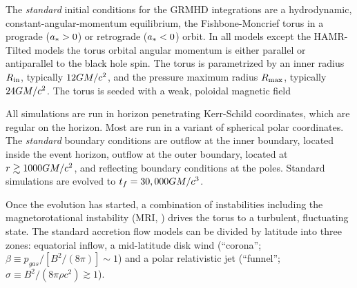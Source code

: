 The \emph{standard} initial conditions for the GRMHD integrations are a hydrodynamic, constant-angular-momentum equilibrium, the Fishbone-Moncrief torus \citep{1976ApJ...207..962F} in a prograde ($a_* > 0$) or retrograde ($a_* < 0$) orbit.  In all models except the HAMR-Tilted models the torus orbital angular momentum is either parallel or antiparallel to the black hole spin. The torus is parametrized by an inner radius $R_{\rm in}$, typically $12GM/c^2$, and the pressure maximum radius $R_{\rm max}$, typically $24GM/c^2$.
The torus is seeded with a weak, poloidal magnetic field %

All simulations are run in horizon penetrating Kerr-Schild coordinates, which are regular on the horizon.  Most are run in a variant of spherical polar coordinates.  The {\em standard} boundary conditions are outflow at the inner boundary, located inside the event horizon, outflow at the outer boundary, located at $r \gtrsim 1000 GM/c^2$, and reflecting boundary conditions at the poles.  Standard  simulations are evolved to $t_f=30,000 GM/c^3$.

Once the evolution has started, a combination of instabilities including the magnetorotational instability (MRI, \citealt{1992ApJ...400..610B}) drives the torus to a turbulent, fluctuating state. The standard accretion flow models can be divided by  latitude into three zones: equatorial inflow, a mid-latitude disk wind (``corona''; $\beta \equiv p_{gas}/[B^2/(8\pi)] \sim 1$) and a polar relativistic jet (``funnel''; $\sigma \equiv B^2/(8\pi \rho c^2) \gtrsim 1$).

